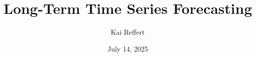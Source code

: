\documentclass[a4paper,oneside,bibliography=totoc]{scrbook}
\begin{document}
\title{Long-Term Time Series Forecasting}
\author{Kai Reffert} \date{July 14, 2025}
\maketitle


\end{document}
